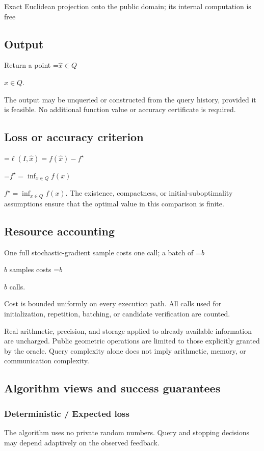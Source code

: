 \documentclass[10pt,a4paper]{article}
\newcommand{\AtlasMath}[1]{\par\begingroup\centering\setbox0=\hbox{$\displaystyle #1$}\ifdim\wd0>1.4\linewidth\typeout{ATLAS WIDE FORMULA: \the\wd0}\fi\ifdim\wd0>\linewidth\resizebox{\linewidth}{!}{\box0}\else\box0\fi\par\endgroup}
\newcommand{\AtlasInlineMath}[1]{\begingroup\setbox0=\hbox{$#1$}\ifdim\wd0>.4\linewidth\endgroup\AtlasMath{#1}\else\endgroup$#1$\fi}
\begin{document}
Exact Euclidean projection onto the public domain; its internal computation is free

\subsection{Output}
Return a point \AtlasInlineMath{\widehat x\in Q}.

The output may be unqueried or constructed from the query history, provided it is feasible. No additional function value or accuracy certificate is required.

\subsection{Loss or accuracy criterion}

\AtlasMath{\ell(I,\widehat{x})=f(\widehat{x})-f^\star}


\AtlasInlineMath{f^\star=\inf_{x\in Q}f(x)}. The existence, compactness, or initial-suboptimality assumptions ensure that the optimal value in this comparison is finite.

\subsection{Resource accounting}
One full stochastic-gradient sample costs one call; a batch of \AtlasInlineMath{b} samples costs \AtlasInlineMath{b} calls.

Cost is bounded uniformly on every execution path. All calls used for initialization, repetition, batching, or candidate verification are counted.

Real arithmetic, precision, and storage applied to already available information are uncharged. Public geometric operations are limited to those explicitly granted by the oracle. Query complexity alone does not imply arithmetic, memory, or communication complexity.

\subsection{Algorithm views and success guarantees}
\subsubsection{Deterministic / Expected loss}
The algorithm uses no private random numbers. Query and stopping decisions may depend adaptively on the observed feedback.
\end{document}
